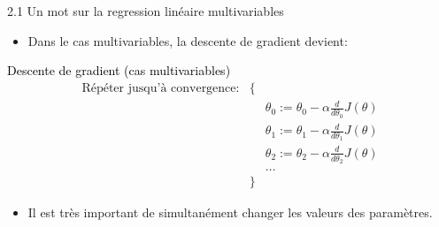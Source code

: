 \begin{frame}{2.1 Un mot sur la regression linéaire multivariables}
  \begin{itemize}
  \item Dans le cas multivariables, la descente de gradient devient:
  \end{itemize}
    \begin{beamerboxesrounded}[scheme=suppervise,width=\textwidth]{\textcolor{black}{Descente de gradient (cas multivariables)}}    
    \vspace{-0.2cm}
    \begin{equation*}
      \begin{matrix} \text{Répéter jusqu'à convergence:} & \{ & \\
        & & \theta_{0} := \theta_{0} - \alpha \frac{d}{d\theta_{0}}J(\theta) \\
        & & \theta_{1} := \theta_{1} - \alpha \frac{d}{d\theta_{1}}J(\theta) \\
        & & \theta_{2} := \theta_{2} - \alpha \frac{d}{d\theta_{2}}J(\theta) \\
        & & \dots \\
        & \} & \end{matrix}
    \end{equation*}
    \vspace{-0.2cm}
  \end{beamerboxesrounded}
    \begin{itemize}
    \item Il est très important de simultanément changer les valeurs des paramètres.
    \end{itemize}
\end{frame}

